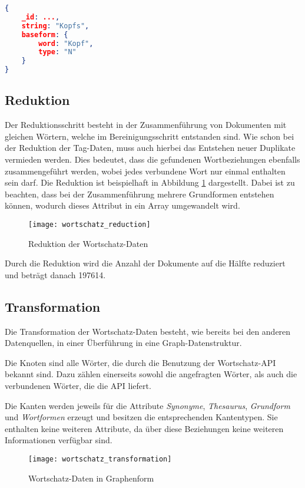 \begin{lstlisting}[language=json, label={lst:word_baseform}, caption={Grundform eines Wortes}]
{
    _id: ...,
    string: "Kopfs",
    baseform: {
        word: "Kopf",
        type: "N"
    }
}
\end{lstlisting}

\subsection{Reduktion}

Der Reduktionsschritt besteht in der Zusammenführung von Dokumenten mit gleichen Wörtern, welche im Bereinigungsschritt entstanden sind. Wie schon bei der Reduktion der Tag-Daten, muss auch hierbei das Entstehen neuer Duplikate vermieden werden. Dies bedeutet, dass die gefundenen Wortbeziehungen ebenfalls zusammengeführt werden, wobei jedes verbundene Wort nur einmal enthalten sein darf. Die Reduktion ist beispielhaft in Abbildung \ref{fig:wortschatz_reduction} dargestellt. Dabei ist zu beachten, dass bei der Zusammenführung mehrere Grundformen entstehen können, wodurch dieses Attribut in ein Array umgewandelt wird.

\begin{figure}
\centering
\texttt{[image: wortschatz\_reduction]}
\caption{Reduktion der Wortschatz-Daten}
\label{fig:wortschatz_reduction}
\end{figure}

Durch die Reduktion wird die Anzahl der Dokumente auf die Hälfte reduziert und beträgt danach \num{197614}.

\subsection{Transformation}

Die Transformation der Wortschatz-Daten besteht, wie bereits bei den anderen Datenquellen, in einer Überführung in eine Graph-Datenstruktur. 

Die Knoten sind alle Wörter, die durch die Benutzung der Wortschatz-API bekannt sind. Dazu zählen einerseits sowohl die angefragten Wörter, als auch die verbundenen Wörter, die die API liefert.

Die Kanten werden jeweils für die Attribute \emph{Synonyme}, \emph{Thesaurus}, \emph{Grundform} und \emph{Wortformen} erzeugt und besitzen die entsprechenden Kantentypen. Sie enthalten keine weiteren Attribute, da über diese Beziehungen keine weiteren Informationen verfügbar sind.
\begin{figure}
\centering
\texttt{[image: wortschatz\_transformation]}
\caption{Wortschatz-Daten in Graphenform}
\label{fig:wortschatz_transformation}
\end{figure}


